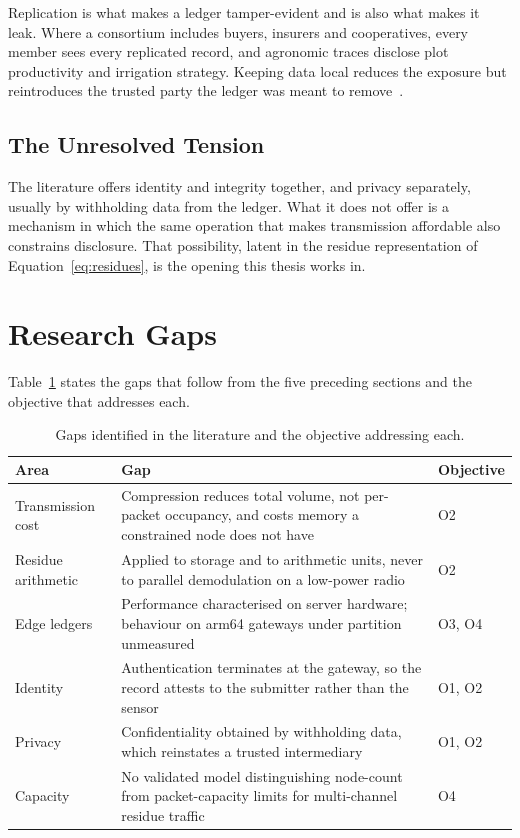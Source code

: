 \documentclass[12pt,a4paper,oneside]{book}
\begin{document}
Replication is what makes a ledger tamper-evident and is also what makes it
leak. Where a consortium includes buyers, insurers and cooperatives, every
member sees every replicated record, and agronomic traces disclose plot
productivity and irrigation strategy. Keeping data local reduces the exposure
but reintroduces the trusted party the ledger was meant to
remove~\cite{wang2021edge}.

\subsection{The Unresolved Tension}

The literature offers identity and integrity together, and privacy separately,
usually by withholding data from the ledger. What it does not offer is a
mechanism in which the same operation that makes transmission affordable also
constrains disclosure. That possibility, latent in the residue representation
of Equation~\ref{eq:residues}, is the opening this thesis works in.

\section{Research Gaps}
\label{sec:lit_gaps}

Table~\ref{tab:gaps} states the gaps that follow from the five preceding
sections and the objective that addresses each.

\begin{table}[htbp]
  \centering
  \caption{Gaps identified in the literature and the objective addressing each.}
  \label{tab:gaps}
  \begin{singlespace}
  \small
  \begin{tabular}{@{}p{3.1cm}p{6.6cm}p{2.6cm}@{}}
    \toprule
    \textbf{Area} & \textbf{Gap} & \textbf{Objective} \\
    \midrule
    Transmission cost
      & Compression reduces total volume, not per-packet occupancy, and costs
        memory a constrained node does not have
      & O2 \\
    Residue arithmetic
      & Applied to storage and to arithmetic units, never to parallel
        demodulation on a low-power radio
      & O2 \\
    Edge ledgers
      & Performance characterised on server hardware; behaviour on \gls{arm64}
        gateways under partition unmeasured
      & O3, O4 \\
    Identity
      & Authentication terminates at the gateway, so the record attests to the
        submitter rather than the sensor
      & O1, O2 \\
    Privacy
      & Confidentiality obtained by withholding data, which reinstates a
        trusted intermediary
      & O1, O2 \\
    Capacity
      & No validated model distinguishing node-count from packet-capacity
        limits for multi-channel residue traffic
      & O4 \\
    \bottomrule
  \end{tabular}
  \end{singlespace}
\end{table}
\end{document}
